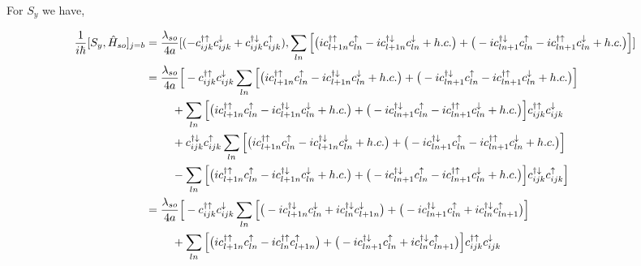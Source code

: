 \documentclass[10pt,prb,showpacs,amssymb,floatfix]{revtex4-1}
\newcommand{\dg}{\dagger}
\newcommand{\dna}{\downarrow}
\newcommand{\nn}{\nonumber}
\newcommand{\upa}{\uparrow}
\newcommand{\lam}{\lambda}
\newcommand{\h}{\hat}
\begin{document}
For $S_y$ we have,

\begin{align}
\frac{1}{i\hbar}[S_y, \h H_{so}]_{j=b} &= \frac{\lam_{so}}{4a}[(-c_{ijk}^{\dg\upa} c_{ijk}^{\dna} + c_{ijk}^{\dg\dna} c_{ijk}^{\upa}), \sum_{ln}  \Big{[} \big{(}i c_{l+1n}^{\dagger \uparrow} c_{l n}^\uparrow  - i c_{l+1n}^{\dagger \downarrow} c_{ln}^\downarrow + h.c. \big{)} +  \big{(} -i c_{l n+1}^{\dagger \downarrow}  c_{l n}^\uparrow  - i c_{ln+1}^{\dagger \uparrow}  c_{ln}^\downarrow + h.c. \big{)}  \Big{]} ] \nn\\
&= \frac{\lambda_{so}}{4a} \Big{[}  - c_{ijk}^{\dg\upa} c_{ijk}^{\dna}  \sum_{ln}  \Big{[} \big{(}i c_{l+1n}^{\dagger \uparrow} c_{l n}^\uparrow  - i c_{l+1n}^{\dagger \downarrow} c_{ln}^\downarrow + h.c. \big{)} +  \big{(} -i c_{l n+1}^{\dagger \downarrow}  c_{l n}^\uparrow  - i c_{ln+1}^{\dagger \uparrow}  c_{ln}^\downarrow + h.c. \big{)}  \Big{]} \nn\\
& ~~~~~~~ + \sum_{ln}  \Big{[} \big{(}i c_{l+1n}^{\dagger \uparrow} c_{l n}^\uparrow  - i c_{l+1n}^{\dagger \downarrow} c_{ln}^\downarrow + h.c. \big{)} +  \big{(} -i c_{l n+1}^{\dagger \downarrow}  c_{l n}^\uparrow  - i c_{ln+1}^{\dagger \uparrow}  c_{ln}^\downarrow + h.c. \big{)}  \Big{]}  c_{ijk}^{\dg\upa} c_{ijk}^{\dna} \nn\\
& ~~~~~~~ + c_{ijk}^{\dg\dna} c_{ijk}^{\upa}  \sum_{ln}  \Big{[} \big{(}i c_{l+1n}^{\dagger \uparrow} c_{l n}^\uparrow  - i c_{l+1n}^{\dagger \downarrow} c_{ln}^\downarrow + h.c. \big{)} +  \big{(} -i c_{l n+1}^{\dagger \downarrow}  c_{l n}^\uparrow  - i c_{ln+1}^{\dagger \uparrow}  c_{ln}^\downarrow + h.c. \big{)}  \Big{]} \nn\\
& ~~~~~~~  - \sum_{ln}  \Big{[} \big{(}i c_{l+1n}^{\dagger \uparrow} c_{l n}^\uparrow  - i c_{l+1n}^{\dagger \downarrow} c_{ln}^\downarrow + h.c. \big{)} +  \big{(} -i c_{l n+1}^{\dagger \downarrow}  c_{l n}^\uparrow  - i c_{ln+1}^{\dagger \uparrow}  c_{ln}^\downarrow + h.c. \big{)}  \Big{]} c_{ijk}^{\dg\dna} c_{ijk}^{\upa}  \Big{]} \nn\\
&= \frac{\lambda_{so}}{4a} \Big{[}  - c_{ijk}^{\dg\upa} c_{ijk}^{\dna}  \sum_{ln}  \Big{[} \big{(}  - i c_{l+1n}^{\dagger \downarrow} c_{ln}^\downarrow + i c_{ln}^{\dagger  \downarrow} c_{l+1n}^{\downarrow} \big{)} +  \big{(} -i c_{l n+1}^{\dagger \downarrow}  c_{l n}^\uparrow + i  c_{l n}^{\dagger  \downarrow} c_{l n+1}^{\uparrow}    \big{)}  \Big{]} \nn\\
& ~~~~~~~ + \sum_{ln}  \Big{[} \big{(}i c_{l+1n}^{\dagger \uparrow} c_{l n}^\uparrow - i c_{l n}^{\dagger \uparrow} c_{l+1n}^{\uparrow}   \big{)} +  \big{(} -i c_{l n+1}^{\dagger \downarrow}  c_{l n}^\uparrow + i c_{l n}^{\dagger  \downarrow} c_{l n+1}^{\uparrow}    \big{)}  \Big{]}  c_{ijk}^{\dg\upa} c_{ijk}^{\dna} \nn\\

\end{align}
\end{document}
